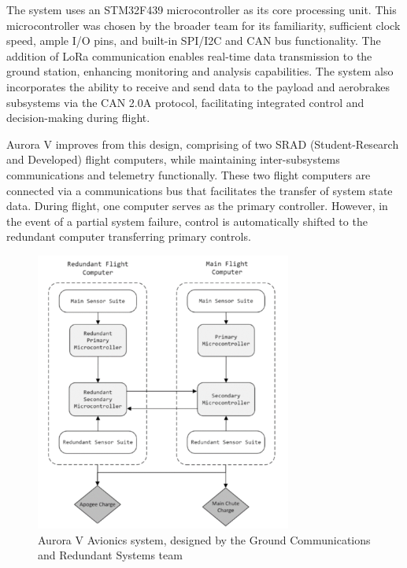 The system uses an STM32F439 microcontroller as its core processing unit. This microcontroller was chosen by the broader team for its familiarity, sufficient clock speed, ample I/O pins, and built-in SPI/I2C and CAN bus functionality. The addition of LoRa communication enables real-time data transmission to the ground station, enhancing monitoring and analysis capabilities. The system also incorporates the ability to receive and send data to the payload and aerobrakes subsystems via the CAN 2.0A protocol, facilitating integrated control and decision-making during flight. 


Aurora V improves from this design, comprising of two SRAD (Student-Research and Developed) flight computers, while maintaining inter-subsystems communications and telemetry functionally. These two flight computers are connected via a communications bus that facilitates the transfer of system state data. During flight, one computer serves as the primary controller. However, in the event of a partial system failure, control is automatically shifted to the redundant computer transferring primary controls. 

\begin{figure}[h]
    \begin{center}
        \includegraphics[width=0.75\textwidth]{./img/redundancy.png}
    \end{center}
    \caption{Aurora V Avionics system, designed by the Ground Communications and Redundant Systems team \cite{avionics}}\label{fig:redundancy}
\end{figure}

